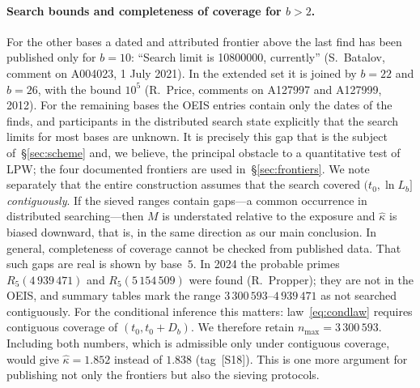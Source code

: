 \documentclass[11pt,a4paper]{article}
\theoremstyle{plain}
\theoremstyle{remark}
\begin{document}
\paragraph{Search bounds and completeness of coverage for $b>2$.} For the other
bases a dated and attributed frontier above the last find has been published
only for $b=10$: ``Search limit is 10800000, currently'' (S.~Batalov, comment
on A004023, 1 July 2021). In the extended set it is joined by $b=22$ and $b=26$,
with the bound $10^5$ (R.~Price, comments on A127997 and A127999, 2012). For the
remaining bases the OEIS entries contain only the dates of the finds, and
participants in the distributed search state explicitly that the search limits
for most bases are unknown. It is precisely this gap that is the subject
of~\S\ref{sec:scheme} and, we believe, the principal obstacle to a quantitative
test of LPW; the four documented frontiers are used in~\S\ref{sec:frontiers}. We
note separately that the entire construction assumes that the search covered
$(t_0,\ln L_b]$ \emph{contiguously}. If the sieved ranges contain gaps---a common
occurrence in distributed searching---then $M$ is understated relative to the
exposure and $\hat\kappa$ is biased downward, that is, in the same direction as
our main conclusion. In general, completeness of coverage cannot be checked from
published data. That such gaps are real is shown by base~$5$. In 2024 the
probable primes $R_5(4\,939\,471)$ and $R_5(5\,154\,509)$ were found
(R.~Propper); they are not in the OEIS, and summary tables mark the range
$3\,300\,593$--$4\,939\,471$ as not searched contiguously. For the conditional
inference this matters: law~\eqref{eq:condlaw} requires contiguous coverage of
$(t_0,t_0+D_b)$. We therefore retain $n_{\max}=3\,300\,593$. Including both
numbers, which is admissible only under contiguous coverage, would give
$\hat\kappa=1.852$ instead of $1.838$ (tag~[S18]). This is one more argument for
publishing not only the frontiers but also the sieving protocols.
\end{document}
